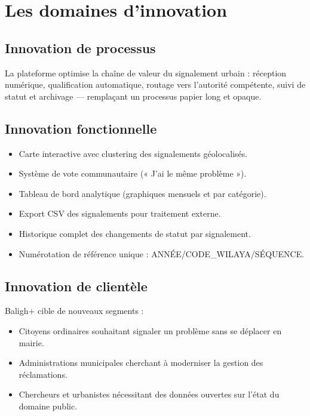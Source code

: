 \documentclass[12pt,a4paper]{report}
\begin{document}
\section{Les domaines d'innovation}

\subsection{Innovation de processus}
La plateforme optimise la chaîne de valeur du signalement urbain : réception
numérique, qualification automatique, routage vers l'autorité compétente, suivi
de statut et archivage — remplaçant un processus papier long et opaque.

\subsection{Innovation fonctionnelle}
\begin{itemize}
  \item Carte interactive avec clustering des signalements géolocalisés.
  \item Système de vote communautaire (« J'ai le même problème »).
  \item Tableau de bord analytique (graphiques mensuels et par catégorie).
  \item Export CSV des signalements pour traitement externe.
  \item Historique complet des changements de statut par signalement.
  \item Numérotation de référence unique : ANNÉE/CODE\_WILAYA/SÉQUENCE.
\end{itemize}

\subsection{Innovation de clientèle}
Baligh+ cible de nouveaux segments :
\begin{itemize}
  \item Citoyens ordinaires souhaitant signaler un problème sans se déplacer
        en mairie.
  \item Administrations municipales cherchant à moderniser la gestion des
        réclamations.
  \item Chercheurs et urbanistes nécessitant des données ouvertes sur l'état
        du domaine public.
\end{itemize}
\end{document}

